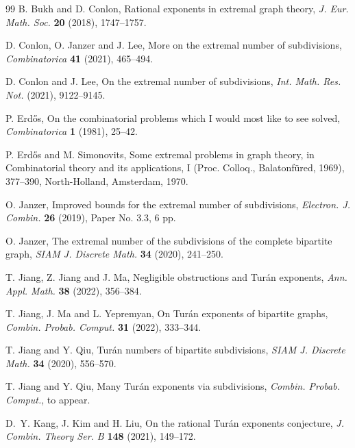 
\begin{thebibliography}{99}
B. Bukh and D. Conlon, Rational exponents in extremal graph theory, {\it J. Eur. Math. Soc.} {\bf 20} (2018), 1747--1757.

D. Conlon, O. Janzer and J. Lee, More on the extremal number of subdivisions, {\it Combinatorica} {\bf 41} (2021), 465--494.

D. Conlon and J. Lee, On the extremal number of subdivisions, {\it Int. Math. Res. Not.} (2021), 9122--9145.

P. Erd\H{o}s, On the combinatorial problems which I would most like to see solved, {\it Combinatorica} {\bf 1} (1981), 25--42.

P. Erd\H{o}s and M. Simonovits, Some extremal problems in graph theory, in Combinatorial theory and its applications, I (Proc. Colloq., Balatonf\"ured, 1969), 377--390, North-Holland, Amsterdam, 1970.


O. Janzer, Improved bounds for the extremal number of subdivisions, {\it Electron. J. Combin.} {\bf 26} (2019), Paper No. 3.3, 6 pp.

O. Janzer, The extremal number of the subdivisions of the complete bipartite graph, {\it SIAM J. Discrete Math.} {\bf 34} (2020), 241--250.

T. Jiang, Z. Jiang and J. Ma, Negligible obstructions and Tur\'an exponents, {\it Ann. Appl. Math.} {\bf 38} (2022), 356--384.

T. Jiang, J. Ma and L. Yepremyan, On Tur\'an exponents of bipartite graphs, {\it Combin. Probab. Comput.} {\bf 31} (2022), 333--344.

T. Jiang and Y. Qiu, Tur\'an numbers of bipartite subdivisions, {\it SIAM J. Discrete Math.} {\bf 34} (2020), 556--570.

T. Jiang and Y. Qiu, Many Tur\'an exponents via subdivisions, {\it Combin. Probab. Comput.}, to appear.

D.~Y. Kang, J. Kim and H. Liu, On the rational Tur\'an exponents conjecture, {\it J. Combin. Theory Ser. B} {\bf 148} (2021), 149--172.

\end{thebibliography}